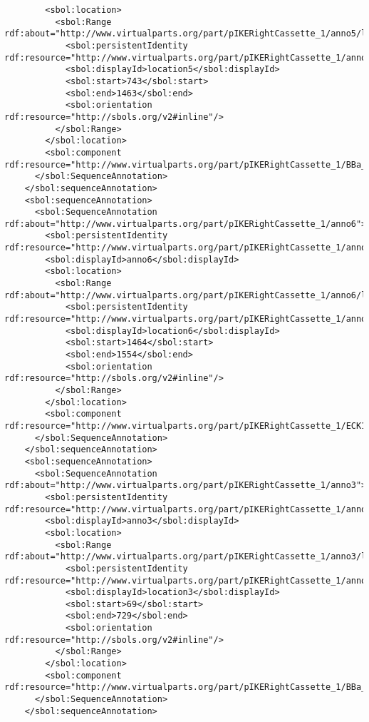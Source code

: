 \begin{lstlisting}
        <sbol:location>
          <sbol:Range rdf:about="http://www.virtualparts.org/part/pIKERightCassette_1/anno5/location5">
            <sbol:persistentIdentity rdf:resource="http://www.virtualparts.org/part/pIKERightCassette_1/anno5/location5"/>
            <sbol:displayId>location5</sbol:displayId>
            <sbol:start>743</sbol:start>
            <sbol:end>1463</sbol:end>
            <sbol:orientation rdf:resource="http://sbols.org/v2#inline"/>
          </sbol:Range>
        </sbol:location>
        <sbol:component rdf:resource="http://www.virtualparts.org/part/pIKERightCassette_1/BBa_E0040"/>
      </sbol:SequenceAnnotation>
    </sbol:sequenceAnnotation>
    <sbol:sequenceAnnotation>
      <sbol:SequenceAnnotation rdf:about="http://www.virtualparts.org/part/pIKERightCassette_1/anno6">
        <sbol:persistentIdentity rdf:resource="http://www.virtualparts.org/part/pIKERightCassette_1/anno6"/>
        <sbol:displayId>anno6</sbol:displayId>
        <sbol:location>
          <sbol:Range rdf:about="http://www.virtualparts.org/part/pIKERightCassette_1/anno6/location6">
            <sbol:persistentIdentity rdf:resource="http://www.virtualparts.org/part/pIKERightCassette_1/anno6/location6"/>
            <sbol:displayId>location6</sbol:displayId>
            <sbol:start>1464</sbol:start>
            <sbol:end>1554</sbol:end>
            <sbol:orientation rdf:resource="http://sbols.org/v2#inline"/>
          </sbol:Range>
        </sbol:location>
        <sbol:component rdf:resource="http://www.virtualparts.org/part/pIKERightCassette_1/ECK120033736"/>
      </sbol:SequenceAnnotation>
    </sbol:sequenceAnnotation>
    <sbol:sequenceAnnotation>
      <sbol:SequenceAnnotation rdf:about="http://www.virtualparts.org/part/pIKERightCassette_1/anno3">
        <sbol:persistentIdentity rdf:resource="http://www.virtualparts.org/part/pIKERightCassette_1/anno3"/>
        <sbol:displayId>anno3</sbol:displayId>
        <sbol:location>
          <sbol:Range rdf:about="http://www.virtualparts.org/part/pIKERightCassette_1/anno3/location3">
            <sbol:persistentIdentity rdf:resource="http://www.virtualparts.org/part/pIKERightCassette_1/anno3/location3"/>
            <sbol:displayId>location3</sbol:displayId>
            <sbol:start>69</sbol:start>
            <sbol:end>729</sbol:end>
            <sbol:orientation rdf:resource="http://sbols.org/v2#inline"/>
          </sbol:Range>
        </sbol:location>
        <sbol:component rdf:resource="http://www.virtualparts.org/part/pIKERightCassette_1/BBa_C0040"/>
      </sbol:SequenceAnnotation>
    </sbol:sequenceAnnotation>

\end{lstlisting}

